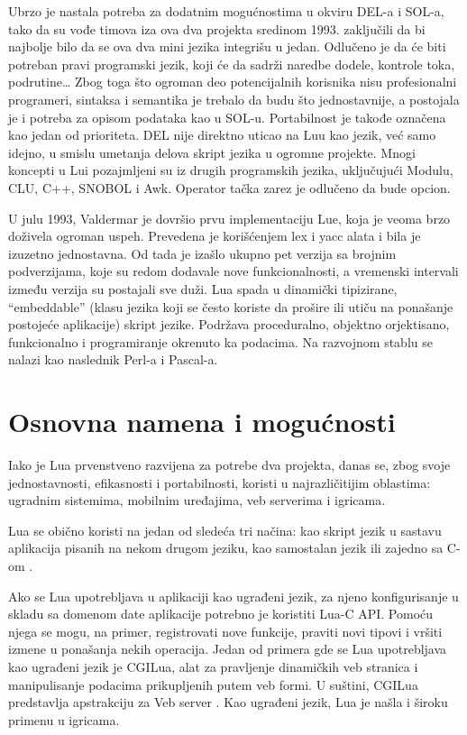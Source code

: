 \documentclass[a4paper]{article}
\begin{document}
Ubrzo je nastala potreba za dodatnim mogućnostima u okviru DEL-a i SOL-a, tako da su vođe timova iza ova dva projekta sredinom 1993. zaključili da bi najbolje bilo da se ova dva mini jezika integrišu u jedan. Odlučeno je da će biti potreban pravi programski jezik, koji će da sadrži naredbe dodele, kontrole toka, podrutine… Zbog toga što ogroman deo potencijalnih korisnika nisu profesionalni programeri, sintaksa i semantika je trebalo da budu što jednostavnije, a postojala je i potreba za opisom podataka kao u SOL-u. Portabilnost je takođe označena kao jedan od prioriteta. DEL nije direktno uticao na Luu kao jezik, već samo idejno, u smislu umetanja delova skript jezika u ogromne projekte. Mnogi koncepti u Lui pozajmljeni su iz drugih programskih jezika, uključujući Modulu, CLU, C++, SNOBOL i Awk. Operator tačka zarez je odlučeno da bude opcion. 

U julu 1993, Valdermar je dovršio prvu implementaciju Lue, koja je veoma brzo doživela ogroman uspeh. Prevedena je korišćenjem lex i yacc alata i bila je izuzetno jednostavna. Od tada je izašlo ukupno pet verzija sa brojnim podverzijama, koje su redom dodavale nove funkcionalnosti, a vremenski intervali između verzija su postajali sve duži. 
Lua spada u dinamički tipizirane, “embeddable” (klasu jezika koji se često koriste da prošire ili utiču na ponašanje postojeće aplikacije) skript jezike. Podržava proceduralno, objektno orjektisano, funkcionalno i programiranje okrenuto ka podacima. Na razvojnom stablu se nalazi kao naslednik Perl-a i Pascal-a. \cite{evolution}




\section{Osnovna namena i mogućnosti}	
\label{sec:namena_i_mogucnosti}

Iako je Lua prvenstveno razvijena za potrebe dva projekta, danas se, zbog svoje jednostavnosti, efikasnosti i portabilnosti, koristi u najrazličitijim oblastima: ugradnim sistemima, mobilnim uređajima, veb serverima i igricama.

Lua se obično koristi na jedan od sledeća tri načina: kao skript jezik u sastavu aplikacija pisanih na nekom drugom jeziku, kao samostalan jezik ili zajedno sa C-om \cite{bookProgInLua}. 

Ako se Lua upotrebljava u aplikaciji kao ugrađeni jezik, za njeno konfigurisanje u skladu sa domenom date aplikacije potrebno je koristiti Lua-C API. Pomoću njega se mogu, na primer, registrovati nove funkcije, praviti novi tipovi i vršiti izmene u ponašanja nekih operacija. Jedan od primera gde se Lua upotrebljava kao ugrađeni jezik je CGILua, alat za pravljenje dinamičkih veb stranica i manipulisanje podacima prikupljenih putem veb formi. U suštini, CGILua predstavlja apstrakciju za Veb server \cite{keplerProject}. Kao ugrađeni jezik, Lua je našla i široku primenu u igricama.
\end{document}
